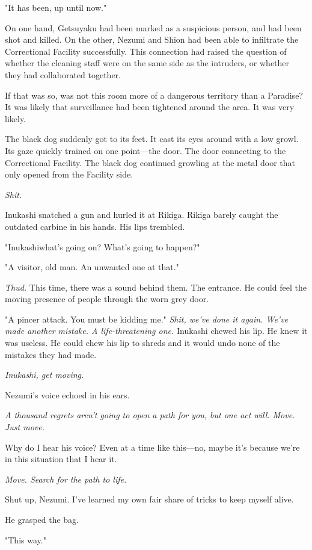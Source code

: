 "It has been, up until now."

On one hand, Getsuyaku had been marked as a suspicious person, and had
been shot and killed. On the other, Nezumi and Shion had been able to
infiltrate the Correctional Facility successfully. This connection had
raised the question of whether the cleaning staff were on the same side
as the intruders, or whether they had collaborated together.

If that was so, was not this room more of a dangerous territory than a
Paradise? It was likely that surveillance had been tightened around the
area. It was very likely.

The black dog suddenly got to its feet. It cast its eyes around with a
low growl. Its gaze quickly trained on one point---the door. The door
connecting to the Correctional Facility. The black dog continued
growling at the metal door that only opened from the Facility side.

\emph{Shit.}

Inukashi snatched a gun and hurled it at Rikiga. Rikiga barely caught
the outdated carbine in his hands. His lips trembled.

"Inukashi\el what's going on? What's going to happen?"

"A visitor, old man. An unwanted one at that."

\emph{Thud.} This time, there was a sound behind them. The entrance. He could
feel the moving presence of people through the worn grey door.

"A pincer attack. You must be kidding me." \emph{Shit, we've done it again.
We've made another mistake. A life-threatening one.} Inukashi chewed his
lip. He knew it was useless. He could chew his lip to shreds and it
would undo none of the mistakes they had made.

\emph{Inukashi, get moving.}

Nezumi's voice echoed in his ears.

\emph{A thousand regrets aren't going to open a path for you, but one act
will. Move. Just move.}

Why do I hear his voice? Even at a time like this---no, maybe it's because
we're in this situation that I hear it.

\emph{Move. Search for the path to life.}

Shut up, Nezumi. I've learned my own fair share of tricks to keep myself
alive.

He grasped the bag.

"This way."

